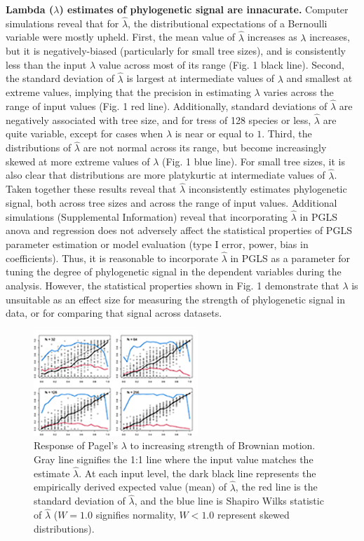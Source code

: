 \documentclass[9pt,twocolumn,twoside,lineno]{pnas-new}
\begin{document}
\textbf{Lambda (\(\lambda\)) estimates of phylogenetic signal are
innacurate.} Computer simulations reveal that for \(\hat{\lambda}\), the
distributional expectations of a Bernoulli variable were mostly upheld.
First, the mean value of \(\hat{\lambda}\) increases as \(\lambda\)
increases, but it is negatively-biased (particularly for small tree
sizes), and is consistently less than the input \(\lambda\) value across
most of its range (Fig. 1 black line). Second, the standard deviation of
\(\hat{\lambda}\) is largest at intermediate values of \(\lambda\) and
smallest at extreme values, implying that the precision in estimating
\(\lambda\) varies across the range of input values (Fig. 1 red line).
Additionally, standard deviations of \(\hat{\lambda}\) are negatively
associated with tree size, and for tress of 128 species or less,
\(\hat{\lambda}\) are quite variable, except for cases when \(\lambda\)
is near or equal to \(1\). Third, the distributions of \(\hat{\lambda}\)
are not normal across its range, but become increasingly skewed at more
extreme values of \(\lambda\) (Fig. 1 blue line). For small tree sizes,
it is also clear that distributions are more platykurtic at intermediate
values of \(\hat{\lambda}\). Taken together these results reveal that
\(\hat\lambda\) inconsistently estimates phylogenetic signal, both
across tree sizes and across the range of input values. Additional
simulations (Supplemental Information) reveal that incorporating
\(\hat\lambda\) in PGLS anova and regression does not adversely affect
the statistical properties of PGLS parameter estimation or model
evaluation (type I error, power, bias in coefficients). Thus, it is
reasonable to incorporate \(\hat\lambda\) in PGLS as a parameter for
tuning the degree of phylogenetic signal in the dependent variables
during the analysis. However, the statistical properties shown in Fig. 1
demonstrate that \(\lambda\) is unsuitable as an effect size for
measuring the strength of phylogenetic signal in data, or for comparing
that signal across datasets.

\begin{figure}
\centering
\includegraphics{new.fig.1.temp.png}
\caption{Response of Pagel's \(\lambda\) to increasing strength of
Brownian motion. Gray line signifies the 1:1 line where the input value
matches the estimate \(\hat\lambda\). At each input level, the dark
black line represents the empirically derived expected value (mean) of
\(\hat\lambda\), the red line is the standard deviation of
\(\hat\lambda\), and the blue line is Shapiro Wilks statistic of
\(\hat\lambda\) (\(W=1.0\) signifies normality, \(W< 1.0\) represent
skewed distributions).{}}
\end{figure}
\end{document}
